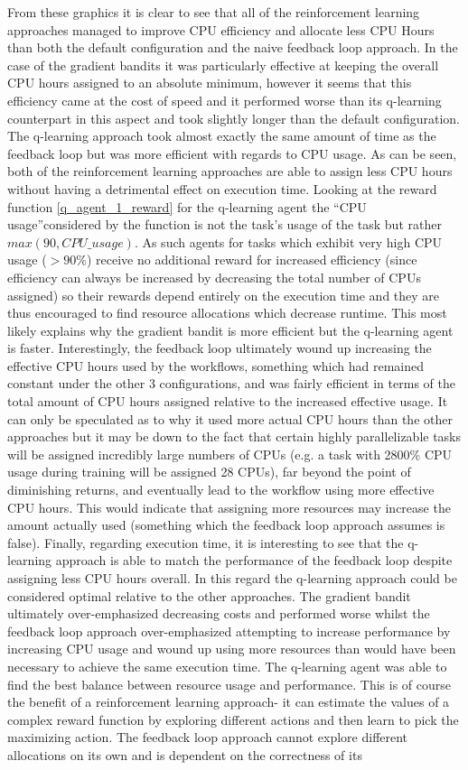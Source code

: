 From these graphics it is clear to see that all of the reinforcement learning approaches managed to improve CPU efficiency and allocate less CPU Hours than both the default configuration and the naive feedback loop approach. In the case of the gradient bandits it was particularly effective at keeping the overall CPU hours assigned to an absolute minimum, however it seems that this efficiency came at the cost of speed and it performed worse than its q-learning counterpart in this aspect and took slightly longer than the default configuration. The q-learning approach took almost exactly the same amount of time as the feedback loop but was more efficient with regards to CPU usage. As can be seen, both of the reinforcement learning approaches are able to assign less CPU hours without having a detrimental effect on execution time. Looking at the reward function \ref{q_agent_1_reward} for the q-learning agent the “CPU usage”considered by the function is not the task’s usage of the task but rather $max(90,CPU\_usage)$. As such agents for tasks which exhibit very high CPU usage ($>90\%$) receive no additional reward for increased efficiency (since efficiency can always be increased by decreasing the total number of CPUs assigned) so their rewards depend entirely on the execution time and they are thus encouraged to find resource allocations which decrease runtime. This most likely explains why the gradient bandit is more efficient but the q-learning agent is faster. Interestingly, the feedback loop ultimately wound up increasing the effective CPU hours used by the workflows, something which had remained constant under the other 3 configurations, and was fairly efficient in terms of the total amount of CPU hours assigned relative to the increased effective usage. It can only be speculated as to why it used more actual CPU hours than the other approaches but it may be down to the fact that certain highly parallelizable tasks will be assigned incredibly large numbers of CPUs (e.g. a task with 2800\% CPU usage during training will be assigned 28 CPUs), far beyond the point of diminishing returns, and eventually lead to the workflow using more effective CPU hours. This would indicate that assigning more resources may increase the amount actually used (something which the feedback loop approach assumes is false). Finally, regarding execution time, it is interesting to see that the q-learning approach is able to match the performance of the feedback loop despite assigning less CPU hours overall. In this regard the q-learning approach could be considered optimal relative to the other approaches. The gradient bandit ultimately over-emphasized decreasing costs and performed worse whilst the feedback loop approach over-emphasized attempting to increase performance by increasing CPU usage and wound up using more resources than would have been necessary to achieve the same execution time. The q-learning agent was able to find the best balance between resource usage and performance. This is of course the benefit of a reinforcement learning approach- it can estimate the values of a complex reward function by exploring different actions and then learn to pick the maximizing action. The feedback loop approach cannot explore different allocations on its own and is dependent on the correctness of its 